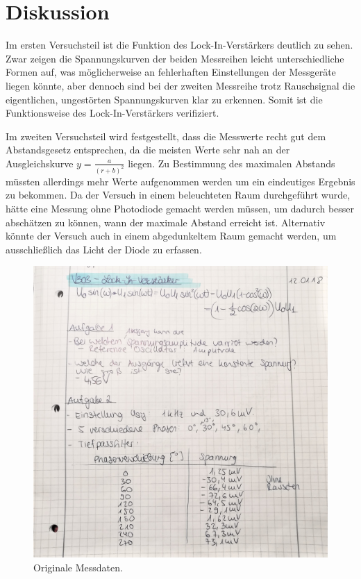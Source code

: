 \section{Diskussion}
Im ersten Versuchsteil ist die Funktion des Lock-In-Verstärkers deutlich zu sehen. Zwar zeigen die Spannungskurven der beiden Messreihen leicht unterschiedliche Formen auf, was möglicherweise an fehlerhaften Einstellungen
der Messgeräte liegen könnte, aber dennoch sind bei der zweiten Messreihe trotz Rauschsignal die eigentlichen, ungestörten Spannungskurven klar zu erkennen. Somit ist die Funktionsweise des Lock-In-Verstärkers
verifiziert.

Im zweiten Versuchsteil wird festgestellt, dass die Messwerte recht gut dem Abstandsgesetz entsprechen, da die meisten Werte sehr nah an der Ausgleichskurve $y = \frac{a}{(r+b)^2}$ liegen. Zu Bestimmung des maximalen Abstands
müssten allerdings mehr Werte aufgenommen werden um ein eindeutiges Ergebnis zu bekommen. Da der Versuch in einem beleuchteten Raum durchgeführt wurde, hätte eine Messung ohne Photodiode gemacht werden müssen, 
um dadurch besser abschätzen zu können, wann der maximale Abstand erreicht ist. Alternativ könnte der Versuch auch in einem abgedunkeltem Raum gemacht werden, um ausschließlich das Licht der Diode zu erfassen. 

\pagebreak
\begin{figure}[h!tbp]
	\centering
	\includegraphics[width=0.9\linewidth]{Messdaten1.jpg}
	\caption{Originale Messdaten. }
\end{figure}

